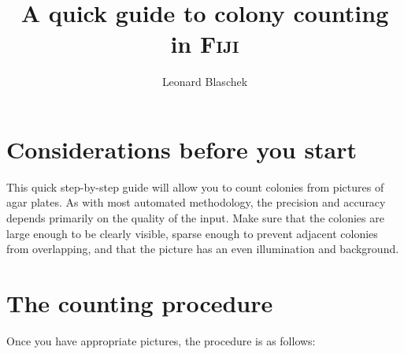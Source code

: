 \documentclass[11pt]{article}
\title{A quick guide to colony counting in \textsc{Fiji}}
\author{Leonard Blaschek}
\begin{document}
 	\maketitle
 	
 	\section*{Considerations before you start}
	This quick step-by-step guide will allow you to count colonies from pictures of agar plates.  As with most automated methodology, the precision and accuracy depends primarily on the quality of the input. Make sure that the colonies are large enough to be clearly visible, sparse enough to prevent adjacent colonies from overlapping, and that the picture has an even illumination and background.
 	
 	\section*{The counting procedure}
 	Once you have appropriate pictures, the procedure is as follows:
\end{document}
